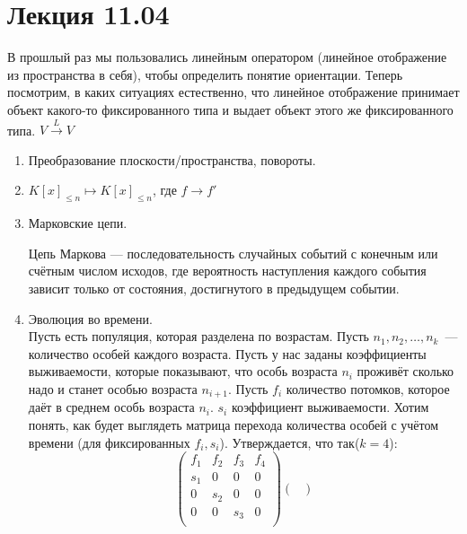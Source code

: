 \section{Лекция 11.04}
\begin{motivation}
    В прошлый раз мы пользовались линейным оператором (линейное отображение из пространства в себя), чтобы определить понятие ориентации. Теперь посмотрим, в каких ситуациях естественно, что линейное отображение принимает объект какого-то фиксированного типа и выдает объект этого же фиксированного типа. $V\xrightarrow{L}V$
\end{motivation}
\begin{examples}
    \begin{enumerate}
        \item Преобразование плоскости/пространства, повороты.
        \item $K[x]_{\le n} \mapsto K[x]_{\le n}$, где  $f\rightarrow f'$
        \item Марковские цепи. \\
        \begin{definition}
            Цепь Маркова — последовательность случайных событий с конечным или счётным числом исходов, где вероятность наступления каждого события зависит только от состояния, достигнутого в предыдущем событии.
        \end{definition}
        \item Эволюция во времени.\\
            Пусть есть популяция, которая разделена по возрастам. Пусть $n_1, n_2,\dots, n_k$~--- количество особей каждого
            возраста. Пусть у нас заданы коэффициенты выживаемости, которые показывают, что особь возраста $n_i$ проживёт
            сколько надо и станет особью возраста $n_{i+1}$. Пусть $f_i$ количество потомков, которое даёт в среднем особь возраста $n_i$.
            $s_i$ коэффициент выживаемости. 
            Хотим понять, как будет выглядеть матрица перехода количества особей с учётом времени (для фиксированных $f_i, s_i$). Утверждается, что так($k = 4$):
            \[
            \begin{pmatrix}
                f_1&f_2&f_3&f_4\\
                s_1&0&0&0\\
                0&s_2&0&0\\
                0&0&s_3&0\\
            \end{pmatrix}
            \begin{pmatrix}

\end{pmatrix}\]
\end{enumerate}
\end{examples}
